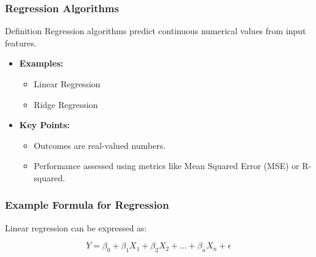 \documentclass[aspectratio=169]{beamer}
\begin{document}
\begin{frame}[fragile]
    \frametitle{Regression Algorithms}

    \begin{block}{Definition}
        Regression algorithms predict continuous numerical values from input features. 
    \end{block}

    \begin{itemize}
        \item \textbf{Examples:}
            \begin{itemize}
                \item Linear Regression
                \item Ridge Regression
            \end{itemize}
        
        \item \textbf{Key Points:}
            \begin{itemize}
                \item Outcomes are real-valued numbers.
                \item Performance assessed using metrics like Mean Squared Error (MSE) or R-squared.
            \end{itemize}
    \end{itemize}
\end{frame}

\begin{frame}[fragile]
    \frametitle{Example Formula for Regression}
    
    Linear regression can be expressed as:

    \begin{equation}
    Y = \beta_0 + \beta_1X_1 + \beta_2X_2 + \ldots + \beta_nX_n + \epsilon
    \end{equation}
\end{frame}
\end{document}

